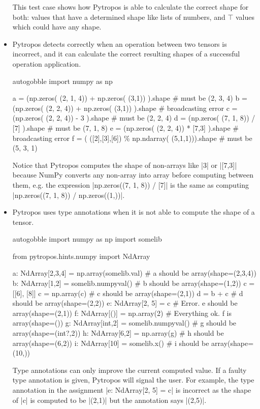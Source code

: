 \begin{itemize}
  This test case shows how Pytropos is able to calculate the correct shape for both:
  values that have a determined shape like lists of numbers, and $\top$ values which could
  have any shape.

\item Pytropos detects correctly when an operation between two tensors is incorrect, and
  it can calculate the correct resulting shapes of a successful operation application.

  \begin{pythoncode*}{autogobble}
     import numpy as np

     a = (np.zeros(  (2, 1, 4)) + np.zeros(    (3,1)) ).shape  # must be (2, 3, 4)
     b = (np.zeros(  (2, 2, 4)) + np.zeros(    (3,1)) ).shape  # broadcasting error
     c = (np.zeros(  (2, 2, 4)) - 3                   ).shape  # must be (2, 2, 4)
     d = (np.zeros(  (7, 1, 8)) / [7]                 ).shape  # must be (7, 1, 8)
     e = (np.zeros(  (2, 2, 4)) * [7,3]               ).shape  # broadcasting error
     f = (        ([2],[3],[6]) \% np.ndarray( (5,1,1))).shape  # must be (5, 3, 1)
  \end{pythoncode*}

  Notice that Pytropos computes the shape of non-arrays like \pycode|3| or \pycode|[7,3]|
  because NumPy converts any non-array into array before computing between them, e.g. the
  expression \pycode|np.zeros((7, 1, 8)) / [7]| is the same as computing
  \pycode|np.zeros((7, 1, 8)) / np.zeros((1,))|.

\item Pytropos uses type annotations when it is not able to compute the shape of a tensor.

  \begin{pythoncode*}{autogobble}
    import numpy as np
    import somelib

    from pytropos.hints.numpy import NdArray

    a: NdArray[2,3,4] = np.array(somelib.val) # a should be array(shape=(2,3,4))
    b: NdArray[1,2] = somelib.numpyval()      # b should be array(shape=(1,2))
    c = [[6], [8]]
    c = np.array(c)                           # c should be array(shape=(2,1))
    d = b + c                                 # d should be array(shape=(2,2))
    e: NdArray[2, 5] = c                      # Error. e should be array(shape=(2,1))
    f: NdArray[()] = np.array(2)              # Everything ok. f is array(shape=())
    g: NdArray[int,2] = somelib.numpyval()    # g should be array(shape=(int?,2))
    h: NdArray[6,2] = np.array(g)             # h should be array(shape=(6,2))
    i: NdArray[10] = somelib.x()              # i should be array(shape=(10,))
  \end{pythoncode*}

  Type annotations can only improve the current computed value. If a faulty type
  annotation is given, Pytropos will signal the user. For example, the type annotation in
  the assignment \pycode|e: NdArray[2, 5] = c| is incorrect as the shape of \pycode|c| is
  computed to be \pycode|(2,1)| but the annotation says \pycode|(2,5)|.

\end{itemize}

